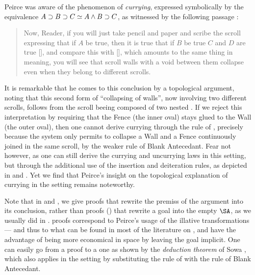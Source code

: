 Peirce was aware of the phenomenon of \emph{currying}, expressed symbolically by
the equivalence $A \supset B \supset C \simeq A \land B \supset C$, as witnessed by
the following passage \cite[p.~535]{peirce_prolegomena_1906}:
\begin{quote}
Now, Reader, if you will just take pencil and paper and scribe the scroll
expressing that if $A$ be true, then it is true that if $B$ be true $C$ and $D$
are true [], and compare this with [],
which amounts to the same thing in meaning, you will see that scroll walls with
a void between them collapse even when they belong to different scrolls.
\end{quote}
It is remarkable that he comes to this conclusion by a topological argument,
noting that this second form of ``collapsing of walls'', now involving two
different scrolls, follows from the scroll beeing composed of two nested
. If we reject this interpretation by requiring that the Fence (the
inner oval) stays glued to the Wall (the outer oval), then one cannot derive
currying through the rule of , precisely because the system
only permits to collapse a Wall and a Fence continuously joined in the same
scroll, by the weaker rule of Blank Antecedant. Fear not however, as one can
still derive the currying and uncurrying laws in this  setting,
but through the additional use of the insertion and deiteration rules, as
depicted in  and . Yet we find that
Peirce's insight on the topological explanation of currying in the 
setting remains noteworthy.

\begin{remark}
Note that in  and , we give
\emph{} proofs that rewrite the premiss of the argument into its
conclusion, rather than \emph{} proofs () that rewrite
a goal into the empty $\SA$, as we usually did in .  proofs
correspond to Peirce's usage of the illative transformations --- and thus to
what can be found in most of the literature on , and have the advantage
of being more economical in space by leaving the goal implicit. One can easily
go from a  proof to a  one as shown by the \emph{deduction
theorem} of Sowa \cite[Section 6]{sowa_peirces_2011}, which also applies in the
 setting by substituting the rule of  with the rule
of Blank Antecedant.
\end{remark}

